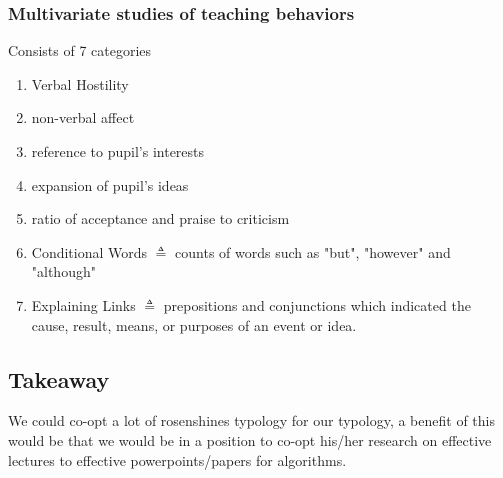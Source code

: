 \documentclass[10pt, letterpaper]{article}
\begin{document}
\subsubsection*{Multivariate studies of teaching behaviors}
\label{sec:org991853c}
Consists of 7 categories
\begin{enumerate}
\item Verbal Hostility
\item non-verbal affect
\item reference to pupil's interests
\item expansion of pupil's ideas
\item ratio of acceptance and praise to criticism
\item Conditional Words \(\triangleq\) counts of words such as "but", "however" and "although"
\item Explaining Links \(\triangleq\) prepositions and conjunctions which indicated the cause, result, means, or purposes of an event or idea.
\end{enumerate}

\subsection*{Takeaway}
\label{sec:orgcbbf60a}
We could co-opt a lot of rosenshines typology for our typology, a benefit of this would be that we would be in a position to co-opt his/her research on effective lectures to effective powerpoints/papers for algorithms.




\end{document}
